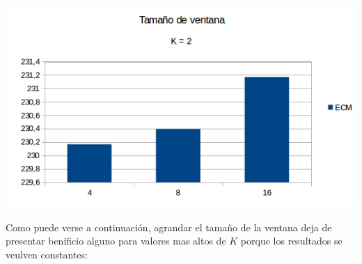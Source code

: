 \begin{center}
\includegraphics[scale=0.50]{imagenes/VK2.png}
\end{center}

Como puede verse a continuación, agrandar el tamaño de la ventana deja de presentar benificio alguno para valores mas altos de $K$ porque los resultados se veulven constantes:

